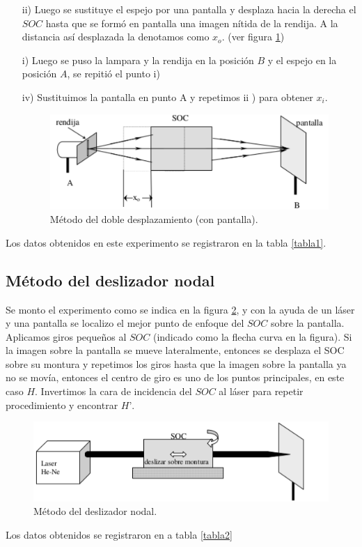 \documentclass[13,twocolumn,letterpaper]{article}
\begin{document}
{{\begin{itemize}
			\item [ ii) ] Luego se sustituye el  espejo por una pantalla y desplaza hacia la derecha el $SOC$ hasta que se form\'o
			en pantalla una imagen nítida de la rendija. A la distancia así desplazada la denotamos como $x_{o}$. (ver figura \ref{fig:fig5})\\
			\item [ i) ] Luego se puso la lampara y la rendija en la posici\'on $B$ y el espejo en la posici\'on $A$, se repiti\'o el punto i) 
			\item [ iv) ] Sustituimos la  pantalla en punto A y repetimos  ii ) para obtener $x_{i}$.
			\begin{figure}[h!]
				\centering
				\includegraphics[width=1.0\linewidth]{fig5}
				\caption{\footnotesize{M\'etodo del doble desplazamiento (con pantalla).}}
				\label{fig:fig5}
			\end{figure}
		\end{itemize}
	Los datos obtenidos en este experimento se registraron en la tabla \ref{tabla1}.
	}

	\subsection{Método del deslizador nodal}
	{	
			Se monto el experimento como se indica en la figura \ref{fig:fig6}, y con la ayuda de un láser y
			una pantalla se localizo el mejor punto de enfoque del $SOC$ sobre la pantalla. Aplicamos giros
			pequeños al $SOC$ (indicado como la flecha curva en la figura). Si la imagen sobre la pantalla se
			mueve lateralmente, entonces se desplaza el SOC sobre su montura y repetimos los giros hasta que la
			imagen sobre la pantalla ya no se mov\'ia, entonces el centro de giro es uno de los puntos
			principales, en este caso $H$. Invertimos la cara de incidencia del $SOC$ al láser para repetir
			procedimiento y encontrar $H’$.
			\begin{figure}[h!]
				\centering
				\includegraphics[width=1.0\linewidth]{fig6}
				\caption{\footnotesize{M\'etodo del deslizador nodal.}}
				\label{fig:fig6}
			\end{figure}
		Los datos obtenidos se registraron en a tabla \ref{tabla2}
	}
}
\end{document}
